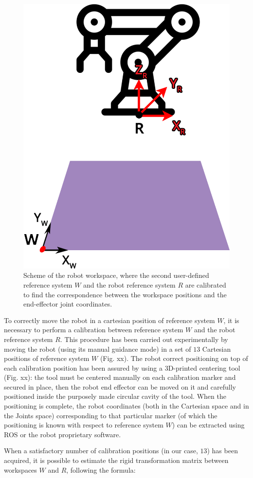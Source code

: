 \documentclass[letterpaper, 10 pt, conference]{ieeeconf}  %
\begin{document}
\begin{figure} [h!]
  \centering
  \includegraphics[width=0.5\columnwidth]{figures/w2.png}
  \caption{Scheme of the robot workspace, where the second user-defined reference system $W$ and the robot reference system $R$ are calibrated to find the correspondence between the workspace positions and the end-effector joint coordinates.}
  \label{fig:w2}
\end{figure}

To correctly move the robot in a cartesian position of reference system $W$, it is necessary to perform a calibration between reference system $W$ and the robot reference system $R$. This procedure has been carried out experimentally by moving the robot (using its manual guidance mode) in a set of $13$ Cartesian positions of reference system $W$ (Fig. xx). %
The robot correct positioning on top of each calibration position has been assured by using a 3D-printed centering tool (Fig. xx): the tool must be centered manually on each calibration marker and secured in place, then the robot end effector can be moved on it and carefully positioned inside the purposely made circular cavity of the tool. When the positioning is complete, the robot coordinates (both in the Cartesian space and in the Joints space) corresponding to that particular marker (of which the positioning is known with respect to reference system $W$) can be extracted using ROS or the robot proprietary software.

When a satisfactory number of calibration positions (in our case, $13$) has been acquired, it is possible to estimate the rigid transformation matrix between workspaces $W$ and $R$, following the formula: %
\end{document}
